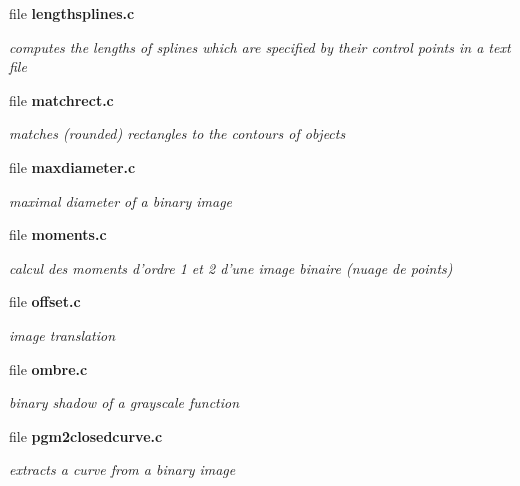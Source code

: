 \begin{CompactItemize}
\item 
file {\bf lengthsplines.c}
\begin{CompactList}\small\item\em computes the lengths of splines which are specified by their control points in a text file \item\end{CompactList}

\item 
file {\bf matchrect.c}
\begin{CompactList}\small\item\em matches (rounded) rectangles to the contours of objects \item\end{CompactList}

\item 
file {\bf maxdiameter.c}
\begin{CompactList}\small\item\em maximal diameter of a binary image \item\end{CompactList}

\item 
file {\bf moments.c}
\begin{CompactList}\small\item\em calcul des moments d'ordre 1 et 2 d'une image binaire (nuage de points) \item\end{CompactList}

\item 
file {\bf offset.c}
\begin{CompactList}\small\item\em image translation \item\end{CompactList}

\item 
file {\bf ombre.c}
\begin{CompactList}\small\item\em binary shadow of a grayscale function \item\end{CompactList}

\item 
file {\bf pgm2closedcurve.c}
\begin{CompactList}\small\item\em extracts a curve from a binary image \item\end{CompactList}


\end{CompactItemize}

